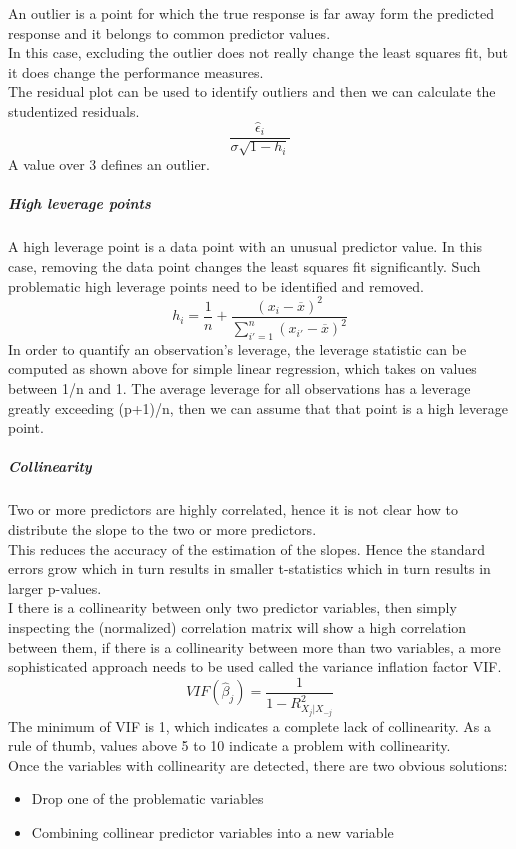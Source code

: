 \documentclass[../document.tex]{subfiles}
\begin{document}
	An outlier is a point for which the true response is far away form the predicted response and it belongs to common predictor values.\\
	In this case, excluding the outlier does not really change the least squares fit, but it does change the performance measures.\\
	The residual plot can be used to identify outliers and then we can calculate the studentized residuals.
	\begin{equation}
	\frac{\hat{\epsilon}_{i}}{\sigma\sqrt{1-h_{i}}}
	\end{equation}
	A value over 3 defines an outlier.
	\subparagraph{High leverage points}
	A high leverage point is a data point with an unusual predictor value. In this case, removing the data point changes the least squares fit significantly. Such problematic high leverage points need to be identified and removed. \\
	\begin{equation}
		h_{i} = \frac{1}{n}+\frac{(x_{i}-\overline{x})^2}{\sum_{i'=1}^{n}(x_{i'}-\overline{x})^2}
	\end{equation}
	In order to quantify an observation's leverage, the leverage statistic can be computed as shown above for simple linear regression, which takes on values between 1/n and 1. The average leverage for all observations has a leverage greatly exceeding (p+1)/n, then we can assume that that point is a high leverage point.
	\subparagraph{Collinearity}
	Two or more predictors are highly correlated, hence it is not clear how to distribute the slope to the two or more predictors. \\
	This reduces the accuracy of the estimation of the slopes. Hence the standard errors grow which in turn results in smaller t-statistics which in turn results in larger p-values.\\
	I there is a collinearity between only two predictor variables, then simply inspecting the (normalized) correlation matrix will show a high correlation between them, if there is a collinearity between more than two variables, a more sophisticated approach needs to be used called the variance inflation factor VIF.
	\begin{equation}
		VIF(\hat{\beta}_{j})=\frac{1}{1-R^2_{X_{j}|X_{-j}}}
	\end{equation}
	The minimum of VIF is 1, which indicates a complete lack of collinearity. As a rule of thumb, values above 5 to 10 indicate a problem with collinearity.\\
	Once the variables with collinearity are detected, there are two obvious solutions:
	\begin{itemize}
		\item Drop one of the problematic variables
		\item Combining collinear predictor variables into a new variable
	\end{itemize}
\end{document}
